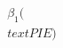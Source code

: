 \documentclass[preview]{standalone}
\begin{document}
\begin{align*}
\beta_1(\\text{PIE})
\end{align*}
\end{document}
